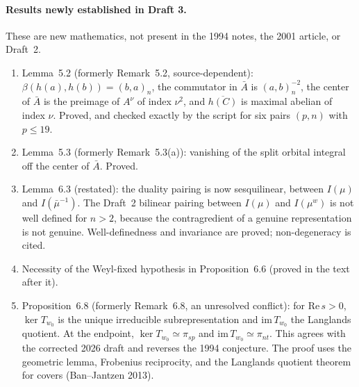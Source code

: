 \documentclass[12pt,letterpaper]{article}
\begin{document}
\paragraph{Results newly established in Draft 3.}
These are new mathematics, not present in the 1994 notes, the 2001 article, or Draft~2.
\begin{enumerate}[leftmargin=*,itemsep=2pt]
\item Lemma~5.2 (formerly Remark~5.2, source-dependent): $\beta(h(a),h(b))=(b,a)_n$, the
commutator in $\bar A$ is $(a,b)_n^{-2}$, the center of $\bar A$ is the preimage of
$A^\nu$ of index $\nu^2$, and $\overline{h(C)}$ is maximal abelian of index $\nu$.  Proved,
and checked exactly by the script for six pairs $(p,n)$ with $p\le19$.
\item Lemma~5.3 (formerly Remark~5.3(a)): vanishing of the split orbital integral off the
center of $\bar A$.  Proved.
\item Lemma~6.3 (restated): the duality pairing is now sesquilinear, between $I(\mu)$ and
$I(\bar\mu^{-1})$.  The Draft~2 bilinear pairing between $I(\mu)$ and $I(\mu^w)$ is not
well defined for $n>2$, because the contragredient of a genuine representation is not
genuine.  Well-definedness and invariance are proved; non-degeneracy is cited.
\item Necessity of the Weyl-fixed hypothesis in Proposition~6.6 (proved in the text after it).
\item Proposition~6.8 (formerly Remark~6.8, an unresolved conflict): for $\mathrm{Re}\,s>0$,
$\ker T_{w_0}$ is the unique irreducible subrepresentation and $\mathrm{im}\,T_{w_0}$ the
Langlands quotient.  At the endpoint, $\ker T_{w_0}\simeq\pi_{sp}$ and
$\mathrm{im}\,T_{w_0}\simeq\pi_{nt}$.  This agrees with the corrected 2026 draft and
reverses the 1994 conjecture.  The proof uses the geometric lemma, Frobenius reciprocity,
and the Langlands quotient theorem for covers (Ban--Jantzen 2013).
\end{enumerate}
\end{document}
